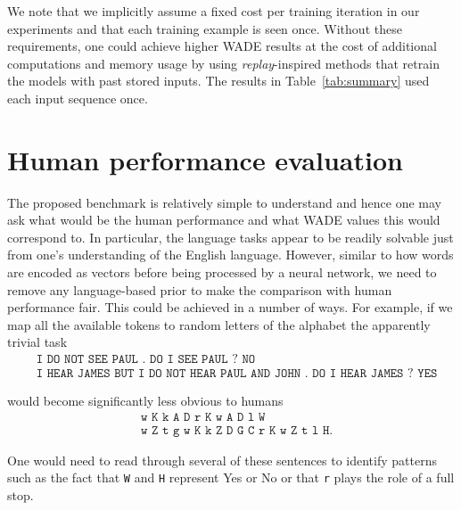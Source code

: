 We note that we implicitly assume a fixed cost per training iteration in our
experiments and that each training example is seen once. Without these
requirements, one could achieve higher WADE results at the cost of additional
computations and memory usage by using \emph{replay}-inspired methods
\cite{hintonUsingFastWeights1987, robinsCatastrophicForgettingNeural1993a,
  gepperthBioInspiredIncrementalLearning2016,
  rebuffiIcarlIncrementalClassifier2017} that retrain the models with past
stored inputs. The results in Table~\ref{tab:summary} used each input sequence
once.

\section{Human performance evaluation}
\label{sec:human}
The proposed benchmark is relatively simple to understand and hence one may ask what would be the human performance and what WADE values this would correspond to. In
particular, the language tasks appear to be readily solvable just from one's
understanding of the English language. However, similar to how words are encoded
as vectors before being processed by a neural network, we need to remove any
language-based prior to make the comparison with human performance fair. This
could be achieved in a number of ways. For example, if we map all the available
tokens to random letters of the alphabet the apparently trivial task
{\small \begin{align*}
          & \texttt{I DO NOT SEE PAUL . DO I SEE PAUL ? NO} \\
          & \texttt{I HEAR JAMES BUT I DO NOT HEAR PAUL AND JOHN . DO I HEAR JAMES ? YES}
\end{align*}}

would become significantly less obvious to humans
{\small
\begin{align*}
  & \texttt{w K k A D r K w A D l W} \\
  & \texttt{w Z t g w K k Z D G C r K w Z t l H}.
\end{align*}
}

One would need to read through several of these sentences to identify patterns
such as the fact that \texttt{W} and \texttt{H} represent Yes or No or that
\texttt{r} plays the role of a full stop.

